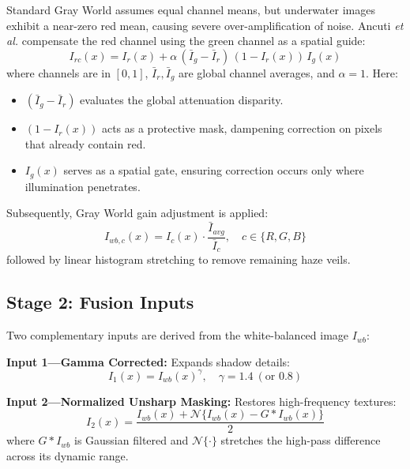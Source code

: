 \documentclass[10pt,twocolumn,letterpaper]{article}
\begin{document}
Standard Gray World assumes equal channel means, but underwater images exhibit a near-zero red mean, causing severe over-amplification of noise. Ancuti \emph{et al.} compensate the red channel using the green channel as a spatial guide:
\begin{equation}
  I_{rc}(x) = I_r(x) + \alpha\,(\bar{I}_g - \bar{I}_r)\,(1 - I_r(x))\,I_g(x)
  \label{eq:redcomp}
\end{equation}
where channels are in $[0,1]$, $\bar{I}_r, \bar{I}_g$ are global channel averages, and $\alpha=1$. Here:
\begin{itemize}
  \item $(\bar{I}_g - \bar{I}_r)$ evaluates the global attenuation disparity.
  \item $(1 - I_r(x))$ acts as a protective mask, dampening correction on pixels that already contain red.
  \item $I_g(x)$ serves as a spatial gate, ensuring correction occurs only where illumination penetrates.
\end{itemize}

Subsequently, Gray World gain adjustment is applied:
\begin{equation}
  I_{wb,c}(x) = I_c(x) \cdot \frac{\bar{I}_{avg}}{\bar{I}_c}, \quad c \in \{R,G,B\}
  \label{eq:grayworld}
\end{equation}
followed by linear histogram stretching to remove remaining haze veils.

\subsection{Stage 2: Fusion Inputs}

Two complementary inputs are derived from the white-balanced image $I_{wb}$:

\textbf{Input 1---Gamma Corrected:} Expands shadow details:
\begin{equation}
  I_1(x) = I_{wb}(x)^{\gamma}, \quad \gamma = 1.4 \ (\text{or } 0.8)
  \label{eq:gamma}
\end{equation}

\textbf{Input 2---Normalized Unsharp Masking:} Restores high-frequency textures:
\begin{equation}
  I_2(x) = \frac{I_{wb}(x) + \mathcal{N}\{I_{wb}(x) - G * I_{wb}(x)\}}{2}
  \label{eq:sharpening}
\end{equation}
where $G * I_{wb}$ is Gaussian filtered and $\mathcal{N}\{\cdot\}$ stretches the high-pass difference across its dynamic range.
\end{document}
